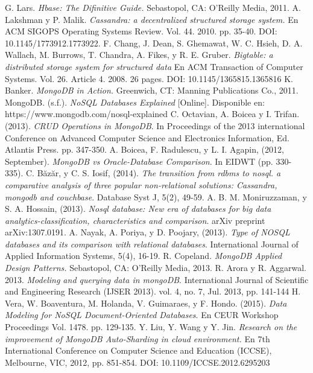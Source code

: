 \documentclass[conference,compsoc]{sty/IEEEtran}
\begin{document}
\begin{thebibliography}{1}
G. Lars. \emph{Hbase: The Difinitive Guide.} Sebastopol, CA: O’Reilly Media, 2011.
A. Lakshman y P. Malik. \emph{Cassandra: a decentralized structured storage system.} En ACM SIGOPS Operating Systems Review. Vol. 44. 2010. pp. 35-40. DOI: 10.1145/1773912.1773922.
F. Chang, J. Dean, S. Ghemawat, W. C. Hsieh, D. A.  Wallach, M. Burrows, T. Chandra, A. Fikes, y R. E. Gruber. \emph{Bigtable: a distributed storage system for structured data} En ACM Transaction of Computer Systems. Vol. 26. Article 4. 2008. 26 pages. DOI: 10.1145/1365815.1365816
K. Banker. \emph{MongoDB in Action.} Greenwich, CT: Manning Publications Co., 2011.
MongoDB. (s.f.). \emph{NoSQL Databases Explained} [Online]. Disponible en: https://www.mongodb.com/nosql-explained
C. Octavian, A. Boicea y I. Trifan. (2013). \emph{CRUD Operations in MongoDB}. In Proceedings of the 2013 international Conference on Advanced Computer Science and Electronics Information, Ed. Atlantis Press. pp. 347-350.
A. Boicea, F. Radulescu, y L. I. Agapin, (2012, September). \emph{MongoDB vs Oracle-Database Comparison}. In EIDWT (pp. 330-335).
C. Băzăr, y C. S. Iosif, (2014). \emph{The transition from rdbms to nosql. a comparative analysis of three popular non-relational solutions: Cassandra, mongodb and couchbase}. Database Syst J, 5(2), 49-59.
A. B. M. Moniruzzaman, y S. A. Hossain, (2013). \emph{Nosql database: New era of databases for big data analytics-classification, characteristics and comparison}. arXiv preprint arXiv:1307.0191.
A. Nayak, A. Poriya, y D. Poojary, (2013). \emph{Type of NOSQL databases and its comparison with relational databases}. International Journal of Applied Information Systems, 5(4), 16-19.
R. Copeland. \emph{MongoDB Applied Design Patterns.} Sebastopol, CA: O’Reilly Media, 2013.
R. Arora y R. Aggarwal. 2013. \emph{Modeling and querying data in mongoDB}. International Journal of Scientific and Engineering Research (IJSER 2013). vol. 4, no. 7, Jul. 2013, pp. 141-144
H. Vera, W. Boaventura, M. Holanda, V. Guimaraes, y F. Hondo. (2015). \emph{Data Modeling for NoSQL Document-Oriented Databases}. En CEUR Workshop Proceedings Vol. 1478. pp. 129-135.
Y. Liu, Y. Wang y Y. Jin. \emph{Research on the improvement of MongoDB Auto-Sharding in cloud environment.} En 7th International Conference on Computer Science and Education (ICCSE), Melbourne, VIC, 2012, pp. 851-854. DOI: 10.1109/ICCSE.2012.6295203

\end{thebibliography}
\end{document}
